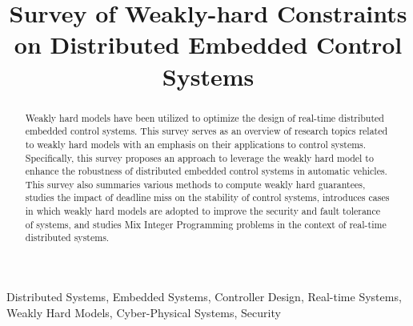 \documentclass[conference]{IEEEtran}
\begin{document}
\title{Survey of Weakly-hard Constraints on Distributed Embedded Control Systems}
\author{
}

\maketitle


\begin{abstract}
  Weakly hard models have been utilized to optimize the design of real-time distributed embedded control systems. This survey serves as an overview of research topics related to weakly hard models with an emphasis on their applications to control systems. Specifically, this survey proposes an approach to leverage the weakly hard model to enhance the robustness of distributed embedded control systems in automatic vehicles. This survey also summaries various methods to compute weakly hard guarantees, studies the impact of deadline miss on the stability of control systems, introduces cases in which weakly hard models are adopted to improve the security and fault tolerance of systems, and studies Mix Integer Programming problems in the context of real-time distributed systems.
\end{abstract}

\begin{IEEEkeywords}
Distributed Systems, Embedded Systems, Controller Design, Real-time Systems, Weakly Hard Models, Cyber-Physical Systems, Security 
\end{IEEEkeywords}










\end{document}
